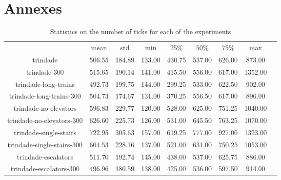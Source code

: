 \section{Annexes}\label{sec:annexes}


\begin{table*}
    \begin{tabular}{|c|cccccccc|}
      & mean & std & min & 25\% & 50\% & 75\% & max \\
    trindade  & 506.55 & 184.89 & 133.00 & 430.75 & 537.00 & 626.00 & 873.00 \\
    trindade-300  & 515.65 & 190.14 & 141.00 & 415.50 & 556.00 & 617.00 & 1352.00 \\
    trindade-long-trains  & 492.73 & 199.75 & 144.00 & 299.25 & 533.00 & 622.50 & 902.00 \\
    trindade-long-trains-300  & 504.73 & 174.67 & 131.00 & 370.25 & 556.50 & 617.00 & 896.00 \\
    trindade-no-elevators  & 596.83 & 229.77 & 120.00 & 528.00 & 625.00 & 751.25 & 1040.00 \\
    trindade-no-elevators-300  & 626.60 & 225.73 & 126.00 & 531.00 & 645.50 & 763.25 & 1070.00 \\
    trindade-single-stairs  & 722.95 & 305.63 & 157.00 & 619.25 & 777.00 & 927.00 & 1393.00 \\
    trindade-single-stairs-300  & 604.53 & 228.16 & 137.00 & 521.00 & 631.00 & 750.25 & 1053.00 \\
    trindade-escalators  & 511.70 & 192.74 & 145.00 & 438.00 & 537.00 & 625.75 & 886.00 \\
    trindade-escalators-300  & 496.96 & 180.59 & 138.00 & 425.00 & 536.00 & 597.50 & 914.00 \\
    \end{tabular}

\caption{Statistics on the number of ticks for each of the experiments}
\label{annex:tick}  
\end{table*}

